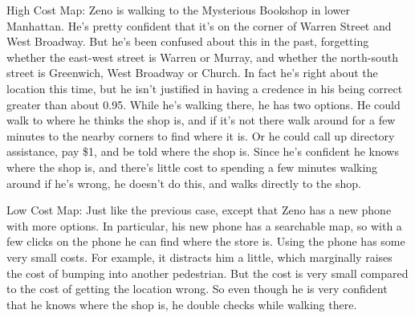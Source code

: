 \documentclass[11pt,oneside]{book}
\begin{document}
\begin{description*}
\item[High Cost Map:] Zeno is walking to the Mysterious Bookshop in lower Manhattan. He's pretty confident that it's on the corner of Warren Street and West Broadway. But he's been confused about this in the past, forgetting whether the east-west street is Warren or Murray, and whether the north-south street is Greenwich, West Broadway or Church. In fact he's right about the location this time, but he isn't justified in having a credence in his being correct greater than about 0.95. While he's walking there, he has two options. He could walk to where he thinks the shop is, and if it's not there walk around for a few minutes to the nearby corners to find where it is. Or he could call up directory assistance, pay \$1, and be told where the shop is. Since he's confident he knows where the shop is, and there's little cost to spending a few minutes walking around if he's wrong, he doesn't do this, and walks directly to the shop.
\item[Low Cost Map:] Just like the previous case, except that Zeno has a new phone with more options. In particular, his new phone has a searchable map, so with a few clicks on the phone he can find where the store is. Using the phone has some very small costs. For example, it distracts him a little, which marginally raises the cost of bumping into another pedestrian. But the cost is very small compared to the cost of getting the location wrong. So even though he is very confident that he knows where the shop is, he double checks while walking there.
\end{description*}
\end{document}
